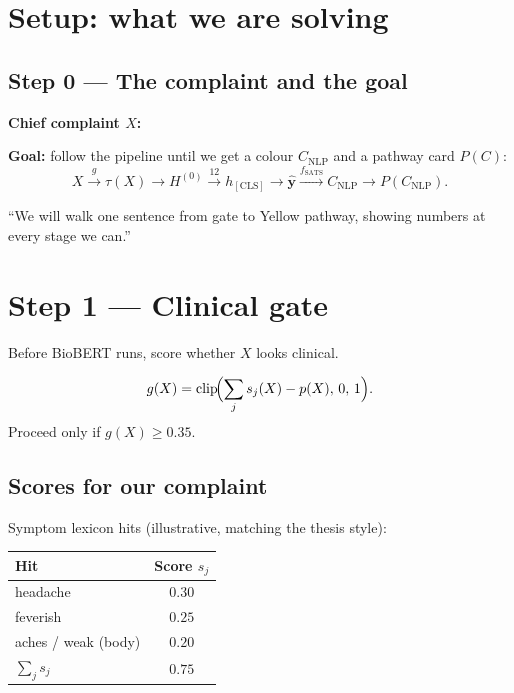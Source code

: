\section{Setup: what we are solving}
\label{sec:setup}

\subsection*{Step 0 --- The complaint and the goal}

\textbf{Chief complaint \(X\):} \runningcomplaint{}

\textbf{Goal:} follow the pipeline until we get a colour \(C_{\mathrm{NLP}}\) and a pathway card \(P(C)\):
\[
  X \xrightarrow{g} \tau(X) \to H^{(0)}
  \xrightarrow{12} h_{\mathrm{[CLS]}}
  \to \hat{\mathbf{y}}
  \xrightarrow{f_{\mathrm{SATS}}} C_{\mathrm{NLP}}
  \to P(C_{\mathrm{NLP}}).
\]

\begin{saybox}
``We will walk one sentence from gate to Yellow pathway, showing numbers at every stage we can.''
\end{saybox}

\section{Step 1 --- Clinical gate}
\label{sec:gate}

Before BioBERT runs, score whether \(X\) looks clinical.

\[
  g(X) = \mathrm{clip}\!\Bigl(\sum_j s_j(X) - p(X),\, 0,\, 1\Bigr).
\]
Proceed only if \(g(X) \ge 0.35\).

\subsection*{Scores for our complaint}

Symptom lexicon hits (illustrative, matching the thesis style):

\begin{center}
\begin{tabular}{@{}lc@{}}
\toprule
Hit & Score \(s_j\) \\
\midrule
headache & \(0.30\) \\
feverish & \(0.25\) \\
aches / weak (body) & \(0.20\) \\
\midrule
\(\sum_j s_j\) & \(0.75\) \\
\bottomrule
\end{tabular}
\end{center}

